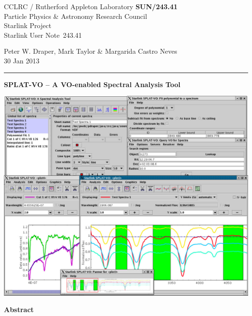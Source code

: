\documentclass[twoside,11pt]{article}
\newcommand{\stardoccategory}  {Starlink User Note}
\newcommand{\stardocinitials}  {SUN}
\newcommand{\stardocnumber}    {243.41}
\newcommand{\stardocauthors}   {Peter W. Draper, Mark Taylor \& Margarida Castro Neves}
\newcommand{\stardocdate}      {30 Jan 2013}
\newcommand{\stardoctitle}     {SPLAT-VO -- A VO-enabled Spectral Analysis Tool}
\newcommand{\stardocname}{\stardocinitials /\stardocnumber}
\newenvironment{latexonly}{}{}
\renewcommand{\_}{\texttt{\symbol{95}}}
\begin{document}
\thispagestyle{empty}

\begin{latexonly}
   CCLRC / Rutherford Appleton Laboratory \hfill \textbf{\stardocname}\\
   {\large Particle Physics \& Astronomy Research Council}\\
   {\large Starlink Project\\}
   {\large \stardoccategory\ \stardocnumber}
   \begin{flushright}
   \stardocauthors\\
   \stardocdate
   \end{flushright}
   \vspace{-4mm}
   \rule{\textwidth}{0.5mm}
   \vspace{5mm}
   \begin{center}
      {\LARGE\textbf{\stardoctitle \\ [2.5ex]}}
   \end{center}
   \vspace{5mm}

\begin{center}
\includegraphics[scale=0.4]{sun243_figures/frontfigure}
\end{center}

   \begin{center}
      {\Large\textbf{Abstract}}
   \end{center}
\end{latexonly}
\end{document}
